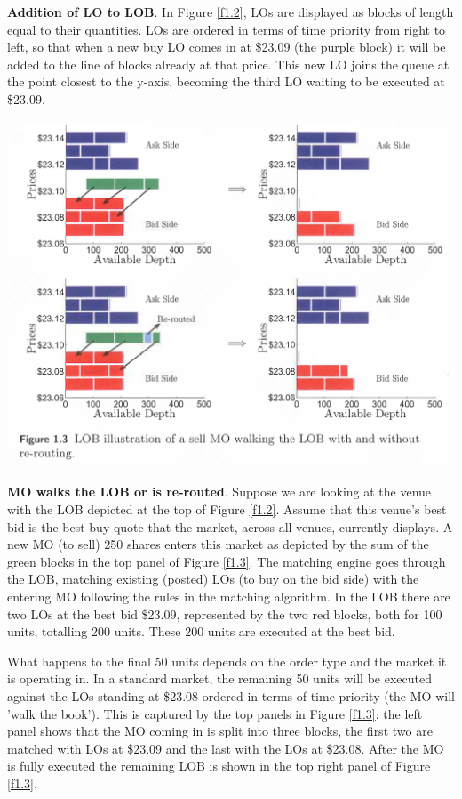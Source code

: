 \documentclass[11pt]{article}
\begin{document}
\textbf{Addition of LO to LOB}. In Figure \ref{f1.2}, LOs are displayed as blocks of length equal to their
quantities. LOs are ordered in terms of time priority from right to left, so that when a new buy LO
comes in at \$23.09 (the purple block) it will be added to the line of blocks already at that price.
This new LO joins the queue at the point closest to the y-axis, becoming the third LO waiting to be
executed at \$23.09.

\begin{center}
\includegraphics[width=.8\textwidth]{../images/Misc/17.png}
\label{f1.3}
\end{center}


\textbf{MO walks the LOB or is re-routed}. Suppose we are looking at the venue with the LOB depicted at the top
 of Figure \ref{f1.2}. Assume that this venue's best bid is the best buy quote that the market, across
 all venues, currently displays. A new MO (to sell) 250 shares enters this market as depicted by the
 sum of the green blocks in the top panel of Figure \ref{f1.3}. The matching engine goes through the
 LOB, matching existing (posted) LOs (to buy on the bid side) with the entering MO following the rules
 in the matching algorithm. In the LOB there are two LOs at the best bid \$23.09, represented by the
 two red blocks, both for 100 units, totalling 200 units. These 200 units are executed at the best
 bid.

What happens to the final 50 units depends on the order type and the market it is operating in.
In a standard market, the remaining 50 units will be executed against the LOs standing at \$23.08
ordered in terms of time-priority (the MO will 'walk the book'). This is captured by the top panels
in Figure \ref{f1.3}: the left panel shows that the MO coming in is split into three blocks, the first
two are matched with LOs at \$23.09 and the last with the LOs at \$23.08. After the MO is fully executed
the remaining LOB is shown in the top right panel of Figure \ref{f1.3}.
\end{document}
